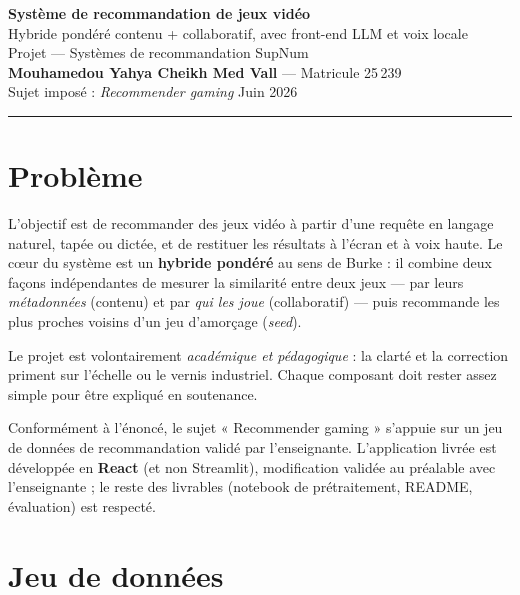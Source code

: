 \documentclass[11pt,a4paper]{article}
\begin{document}
\begin{center}
  {\LARGE\bfseries Système de recommandation de jeux vidéo}\\[2pt]
  {\large Hybride pondéré contenu + collaboratif, avec front-end LLM et voix locale}\\[10pt]
  {\normalsize Projet — Systèmes de recommandation \quad\textbullet\quad SupNum}\\[2pt]
  {\normalsize \textbf{Mouhamedou Yahya Cheikh Med Vall} — Matricule 25\,239}\\[2pt]
  {\normalsize Sujet imposé : \emph{Recommender gaming} \quad\textbullet\quad Juin 2026}
\end{center}

\vspace{0.4em}
\hrule
\vspace{1em}

\section{Problème}

L'objectif est de recommander des jeux vidéo à partir d'une requête en langage
naturel, tapée ou dictée, et de restituer les résultats à l'écran et à voix
haute. Le c\oe ur du système est un \textbf{hybride pondéré} au sens de Burke :
il combine deux façons indépendantes de mesurer la similarité entre deux jeux —
par leurs \emph{métadonnées} (contenu) et par \emph{qui les joue} (collaboratif)
— puis recommande les plus proches voisins d'un jeu d'amorçage (\emph{seed}).

Le projet est volontairement \emph{académique et pédagogique} : la clarté et la
correction priment sur l'échelle ou le vernis industriel. Chaque composant doit
rester assez simple pour être expliqué en soutenance.

Conformément à l'énoncé, le sujet « Recommender gaming » s'appuie sur un jeu de
données de recommandation validé par l'enseignante. L'application livrée est
développée en \textbf{React} (et non Streamlit), modification validée au
préalable avec l'enseignante ; le reste des livrables (notebook de
prétraitement, README, évaluation) est respecté.

\section{Jeu de données}
\end{document}
